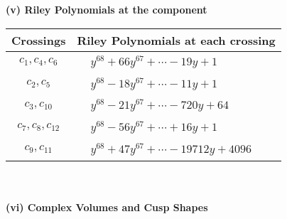 \documentclass[1p]{elsarticle_modified}
\theoremstyle{definition}
\begin{document}
\newpage\renewcommand{\arraystretch}{1}
\flushleft \textbf{(v) Riley Polynomials at the component}\newline \\
\begin{tabular}{m{50pt}|m{274pt}}
Crossings & \hspace{64pt}Riley Polynomials at each crossing \\
\hline $$\begin{aligned}c_{1},c_{4},c_{6}\end{aligned}$$&$\begin{aligned}
&y^{68}+66 y^{67}+\cdots-19 y+1
\end{aligned}$\\
\hline $$\begin{aligned}c_{2},c_{5}\end{aligned}$$&$\begin{aligned}
&y^{68}-18 y^{67}+\cdots-11 y+1
\end{aligned}$\\
\hline $$\begin{aligned}c_{3},c_{10}\end{aligned}$$&$\begin{aligned}
&y^{68}-21 y^{67}+\cdots-720 y+64
\end{aligned}$\\
\hline $$\begin{aligned}c_{7},c_{8},c_{12}\end{aligned}$$&$\begin{aligned}
&y^{68}-56 y^{67}+\cdots+16 y+1
\end{aligned}$\\
\hline $$\begin{aligned}c_{9},c_{11}\end{aligned}$$&$\begin{aligned}
&y^{68}+47 y^{67}+\cdots-19712 y+4096
\end{aligned}$\\
\hline
\end{tabular}\\~\\
\newpage\flushleft \textbf{(vi) Complex Volumes and Cusp Shapes}
\end{document}
